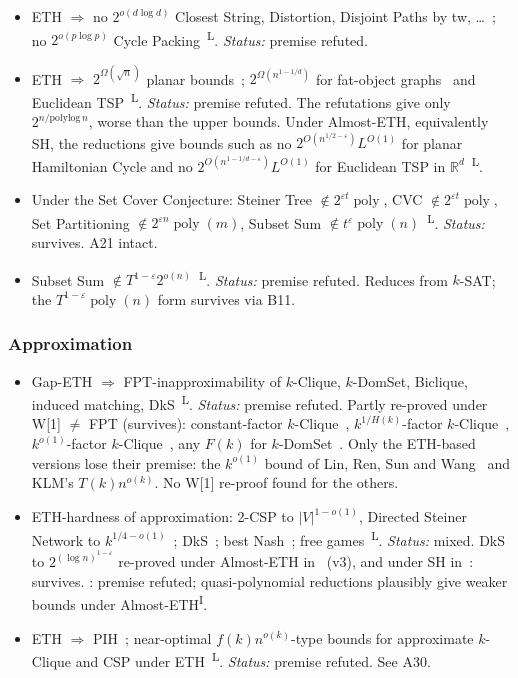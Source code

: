\documentclass[10pt]{amsart}
\theoremstyle{plain}
\theoremstyle{definition}
\theoremstyle{remark}
\numberwithin{equation}{section}
\newcommand{\poly}{\operatorname{poly}}
\newcommand{\Lit}{\textsuperscript{L}}
\newcommand{\Inf}{\textsuperscript{I}}
\begin{document}
{\begin{itemize}[leftmargin=2.6em,itemsep=2pt]
\item[B21] ETH $\Rightarrow$ no $2^{o(d\log d)}$ Closest String, Distortion, Disjoint Paths by tw, \dots~\cite{LMS18super}; no $2^{o(p\log p)}$ Cycle Packing~\cite[Thm.~1.4]{CutAndCount11}\Lit. \emph{Status:} premise refuted. 
\item[B22] ETH $\Rightarrow$ $2^{\Omega(\sqrt n)}$ planar bounds~\cite{LMS11}; $2^{\Omega(n^{1-1/d})}$ for fat-object graphs~\cite{dBBKMZ18} and Euclidean TSP~\cite{dBBKK18}\Lit. \emph{Status:} premise refuted. The refutations give only $2^{n/\mathrm{polylog}\,n}$, worse than the upper bounds. Under Almost-ETH, equivalently SH, the reductions give bounds such as no $2^{O(n^{1/2-\varepsilon})}L^{O(1)}$ for planar Hamiltonian Cycle and no $2^{O(n^{1-1/d-\varepsilon})}L^{O(1)}$ for Euclidean TSP in $\mathbb{R}^d$~\cite[Thm.~3.1, Table~1]{MIT26}\Lit.
\item[B11] Under the Set Cover Conjecture: Steiner Tree $\notin2^{\varepsilon t}\poly$, CVC $\notin2^{\varepsilon t}\poly$, Set Partitioning $\notin2^{\varepsilon n}\poly(m)$, Subset Sum $\notin t^{\varepsilon}\poly(n)$~\cite[Thm.~1.2]{CDLMNOPSW16}\Lit. \emph{Status:} survives. A21 intact.
\item[B12] Subset Sum $\notin T^{1-\varepsilon}2^{o(n)}$~\cite{ABHS19}\Lit. \emph{Status:} premise refuted. Reduces from $k$-SAT; the $T^{1-\varepsilon}\poly(n)$ form survives via B11.
\end{itemize}
\subsubsection*{Approximation}
\begin{itemize}[leftmargin=2.6em,itemsep=2pt]
\item[B23] Gap-ETH $\Rightarrow$ FPT-inapproximability of $k$-Clique, $k$-DomSet, Biclique, induced matching, DkS~\cite{CCKLMNT17}\Lit. \emph{Status:} premise refuted. Partly re-proved under W[1] $\ne$ FPT (survives): constant-factor $k$-Clique~\cite{Lin21}, $k^{1/H(k)}$-factor $k$-Clique~\cite{KK22}, $k^{o(1)}$-factor $k$-Clique~\cite{CFLL25}, any $F(k)$ for $k$-DomSet~\cite{KLM18}. Only the ETH-based versions lose their premise: the $k^{o(1)}$ bound of Lin, Ren, Sun and Wang~\cite{LRSW22} and KLM's $T(k)n^{o(k)}$. No W[1] re-proof found for the others.
\item[B24] ETH-hardness of approximation: 2-CSP to $|V|^{1-o(1)}$, Directed Steiner Network to $k^{1/4-o(1)}$~\cite{DM18}; DkS~\cite{Man26}; best Nash~\cite{BKW15}; free games~\cite{AIM14}\Lit. \emph{Status:} mixed. DkS to $2^{(\log n)^{1-\varepsilon}}$ re-proved under Almost-ETH in~\cite{Man26} (v3), and under SH in~\cite[\S4]{MIT26}: survives. \cite{DM18,BKW15,AIM14}: premise refuted; quasi-polynomial reductions plausibly give weaker bounds under Almost-ETH\Inf.
\item[B25] ETH $\Rightarrow$ PIH~\cite{GLRSW24}; near-optimal $f(k)n^{o(k)}$-type bounds for approximate $k$-Clique and CSP under ETH~\cite{GLRSW25}\Lit. \emph{Status:} premise refuted. See A30.
\end{itemize}
}
\end{document}
